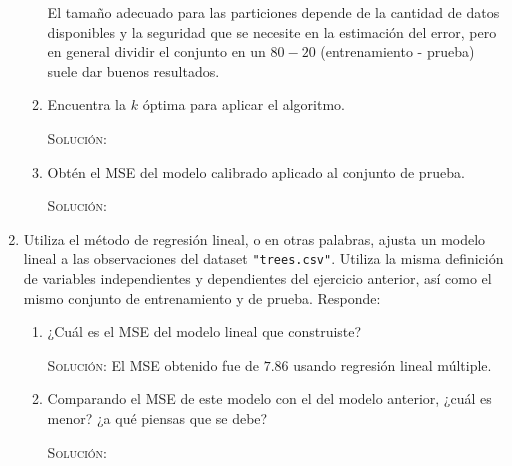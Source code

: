 \documentclass[letterpaper,11pt]{article}
\begin{document}
\begin{enumerate}
\begin{enumerate}
        El tamaño adecuado para las particiones depende de la cantidad de 
        datos disponibles y la seguridad que se necesite en la estimación 
        del error, pero en general dividir el conjunto en un $80-20$ 
        (entrenamiento - prueba) suele dar buenos resultados.

        \item Encuentra la $k$ óptima para aplicar el algoritmo.
        
        \textsc{Solución:}

        \item Obtén el MSE del modelo calibrado aplicado al conjunto de prueba.
        
        \textsc{Solución:}
    \end{enumerate}

    \item Utiliza el método de regresión lineal, o en otras palabras, ajusta 
    un modelo lineal a las observaciones del dataset \texttt{"trees.csv"}. 
    Utiliza la misma definición de variables independientes y dependientes del 
    ejercicio anterior, así como el mismo conjunto de entrenamiento y de prueba.
    Responde:
    \begin{enumerate}
        \item ¿Cuál es el MSE del modelo lineal que construiste?
        
        \textsc{Solución:} El MSE obtenido fue de $7.86$ usando regresión 
        lineal múltiple.

        \item Comparando el MSE de este modelo con el del modelo anterior, 
        ¿cuál es menor? ¿a qué piensas que se debe?

        \textsc{Solución:}
        
    \end{enumerate}
\end{enumerate}
\end{document}
